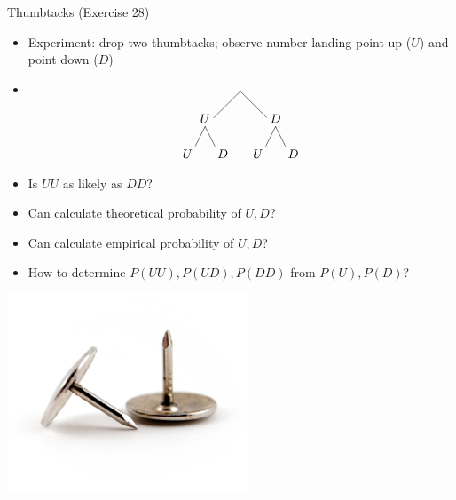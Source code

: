 \documentclass{beamer}
\theoremstyle{definition}
\begin{document}
\begin{frame}{Thumbtacks (Exercise 28)}
\begin{multicols}{2}
\begin{itemize}
\item Experiment: drop two thumbtacks; observe number
landing point up ($U$) and point down ($D$)
\item
\[\begin{xy}<1cm,0cm>:
(0,0)="0";
(-1,-1)="1";
(1,-1)="2";
"0";"1"*+!D{U}**\dir{-};
"0";"2"*+!D{D}**\dir{-};
"1";(-1.5,-2)*+!D{U}**\dir{-};
"1";(-.5,-2)*+!D{D}**\dir{-};
"2";(.5,-2)*+!D{U}**\dir{-};
"2";(1.5,-2)*+!D{D}**\dir{-};
\end{xy}\]
\item Is $UU$ as likely as $DD$?
\item Can calculate theoretical probability of $U,D$?
\item Can calculate empirical probability of $U,D$?
\item How to determine $P\left(UU\right),P\left(UD\right),
P\left(DD\right)$
from $P\left(U\right),P\left(D\right)$?
\end{itemize}
\includegraphics[scale=.5]{Thumbtacks}
\end{multicols}
\end{frame}
\end{document}

